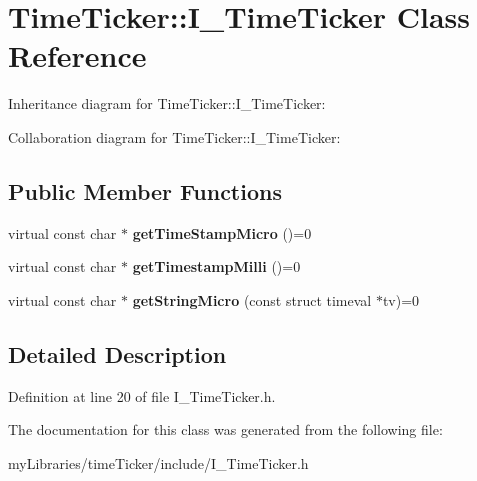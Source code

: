 \hypertarget{classTimeTicker_1_1I__TimeTicker}{}\section{Time\+Ticker\+::I\+\_\+\+Time\+Ticker Class Reference}
\label{classTimeTicker_1_1I__TimeTicker}


Inheritance diagram for Time\+Ticker\+::I\+\_\+\+Time\+Ticker\+:


Collaboration diagram for Time\+Ticker\+::I\+\_\+\+Time\+Ticker\+:
\subsection*{Public Member Functions}
\begin{DoxyCompactItemize}
\item 
\mbox{\label{classTimeTicker_1_1I__TimeTicker_aa4dbb75d59ccaf44890ff02a718cd81c}} 
virtual const char $\ast$ {\bfseries get\+Time\+Stamp\+Micro} ()=0
\item 
\mbox{\label{classTimeTicker_1_1I__TimeTicker_a4cfee716c4df8baf77900ceaf66bd135}} 
virtual const char $\ast$ {\bfseries get\+Timestamp\+Milli} ()=0
\item 
\mbox{\label{classTimeTicker_1_1I__TimeTicker_af163f0a65ea8f9c8115a20d4f64634eb}} 
virtual const char $\ast$ {\bfseries get\+String\+Micro} (const struct timeval $\ast$tv)=0
\end{DoxyCompactItemize}


\subsection{Detailed Description}


Definition at line 20 of file I\+\_\+\+Time\+Ticker.\+h.



The documentation for this class was generated from the following file\+:\begin{DoxyCompactItemize}
\item 
my\+Libraries/time\+Ticker/include/I\+\_\+\+Time\+Ticker.\+h\end{DoxyCompactItemize}
